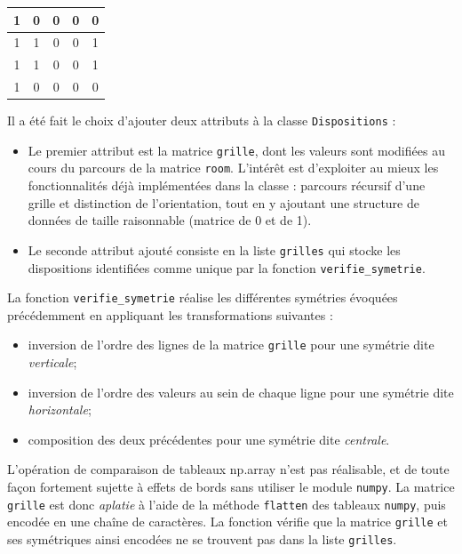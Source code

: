 \begin{multicols}{2}
\begin{center}
        \begin{tabular}{|c |c |c |c |c |} \hline
            \cellcolor{tsyellow}1 & \cellcolor{tsforestgreen}0 & \cellcolor{tsforestgreen}0 & \cellcolor{tsforestgreen}0 & \cellcolor{tsforestgreen}0 \\ \hline
            \cellcolor{tsyellow}1 & \cellcolor{tsyellow}1      & \cellcolor{tsforestgreen}0 & \cellcolor{tsforestgreen}0 & \cellcolor{tsyellow}1      \\ \hline
            \cellcolor{tsyellow}1 & \cellcolor{tsyellow}1      & \cellcolor{tsforestgreen}0 & \cellcolor{tsforestgreen}0 & \cellcolor{tsyellow}1      \\ \hline
            \cellcolor{tsyellow}1 & \cellcolor{tsforestgreen}0 & \cellcolor{tsforestgreen}0 & \cellcolor{tsforestgreen}0 & \cellcolor{tsforestgreen}0 \\ \hline
        \end{tabular}
    \end{center}

\end{multicols}

Il a été fait le choix d'ajouter deux attributs à la classe \texttt{Dispositions} :
\begin{itemize}
    \item Le premier attribut est la matrice \texttt{grille}, dont les valeurs sont modifiées au cours du
          parcours de la matrice \texttt{room}. L'intérêt est d'exploiter au mieux les fonctionnalités déjà implémentées
          dans la classe : parcours récursif d'une grille et distinction de l'orientation, tout en y ajoutant une
          structure de données de taille raisonnable (matrice de 0 et de 1).
    \item Le seconde attribut ajouté consiste en la liste \texttt{grilles} qui stocke les dispositions
          identifiées comme unique par la fonction \texttt{verifie\_symetrie}.
\end{itemize}

La fonction \texttt{verifie\_symetrie} réalise les différentes symétries évoquées précédemment en appliquant
les transformations suivantes :
\begin{itemize}
    \item inversion de l'ordre des lignes de la matrice \texttt{grille} pour une symétrie dite \emph{verticale};
    \item inversion de l'ordre des valeurs au sein de chaque ligne pour une symétrie dite \emph{horizontale};
    \item composition des deux précédentes pour une symétrie dite \emph{centrale}.
\end{itemize}
L'opération de comparaison de tableaux np.array n'est pas réalisable, et de toute façon fortement sujette
à effets de bords sans utiliser le module \texttt{numpy}. La matrice \texttt{grille} est donc \emph{aplatie} à
l'aide de la méthode \texttt{flatten} des tableaux \texttt{numpy}, puis encodée en une chaîne de caractères.
La fonction vérifie que la matrice \texttt{grille} et ses symétriques ainsi encodées ne se trouvent pas dans
la liste \texttt{grilles}.\\

